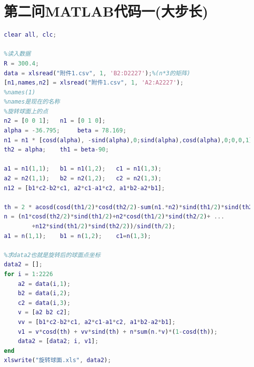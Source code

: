 \documentclass[withoutpreface,bwprint]{cumcmthesis} %
\begin{document}
\begin{appendices}
\begin{lstlisting}[language=matlab]
\end{lstlisting}
\section{第二问MATLAB代码一(大步长)}
\begin{lstlisting}[language=matlab]
clear all, clc;

%读入数据
R = 300.4;
data = xlsread("附件1.csv", 1, 'B2:D2227');%(n*3的矩阵)
[n1,names,n2] = xlsread("附件1.csv", 1, 'A2:A2227');
%names(1)
%names是现在的名称
%旋转球面上的点
n2 = [0 0 1];   n1 = [0 1 0];   
alpha = -36.795;     beta = 78.169;
n1 = n1 * [cosd(alpha), -sind(alpha),0;sind(alpha),cosd(alpha),0;0,0,1];
th2 = alpha;    th1 = beta-90;

a1 = n1(1,1);   b1 = n1(1,2);   c1 = n1(1,3);
a2 = n2(1,1);   b2 = n2(1,2);   c2 = n2(1,3);
n12 = [b1*c2-b2*c1, a2*c1-a1*c2, a1*b2-a2*b1];

th = 2 * acosd(cosd(th1/2)*cosd(th2/2)-sum(n1.*n2)*sind(th1/2)*sind(th2/2));
n = (n1*cosd(th2/2)*sind(th1/2)+n2*cosd(th1/2)*sind(th2/2)+ ...
        +n12*sind(th1/2)*sind(th2/2))/sind(th/2);
a1 = n(1,1);    b1 = n(1,2);    c1=n(1,3);

%求data2也就是旋转后的球面点坐标
data2 = [];
for i = 1:2226
    a2 = data(i,1);
    b2 = data(i,2);
    c2 = data(i,3);
    v = [a2 b2 c2];
    vv = [b1*c2-b2*c1, a2*c1-a1*c2, a1*b2-a2*b1];
    v1 = v*cosd(th) + vv*sind(th) + n*sum(n.*v)*(1-cosd(th));
    data2 = [data2; i, v1];
end
xlswrite("旋转球面.xls", data2);


\end{lstlisting}
\end{appendices}
\end{document}
